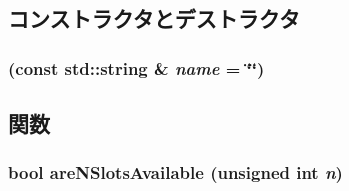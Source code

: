 \subsection{コンストラクタとデストラクタ}
\hypertarget{classMessageBuffer_a3ab015b49b89f6f1e8c9facc8441976f}{
\subsubsection[{MessageBuffer}]{ (const std::string \& {\em name} = {\ttfamily \char`\"{}\char`\"{}})}}
\label{classMessageBuffer_a3ab015b49b89f6f1e8c9facc8441976f}


\subsection{関数}
\hypertarget{classMessageBuffer_a3164aa5c5bbbd31b6b1963ef9c90756f}{
\subsubsection[{areNSlotsAvailable}]{\setlength{\rightskip}{0pt plus 5cm}bool areNSlotsAvailable (unsigned int {\em n})}}
\label{classMessageBuffer_a3164aa5c5bbbd31b6b1963ef9c90756f}



